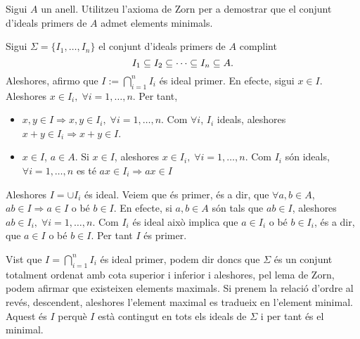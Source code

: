 \documentclass[../main.tex]{subfiles}
\begin{document}
\setcounter{exercici}{25}
\begin{exercici}
\label{esal26}
Sigui $A$ un anell. Utilitzeu l'axioma de Zorn per a demostrar que el conjunt d'ideals primers de $A$ admet elements minimals.
\end{exercici}
\begin{sol}
Sigui $\Sigma = \{I_1,\ldots,I_n\}$ el conjunt d'ideals primers de $A$ complint
\begin{equation}
    \notag
    I_1\subseteq I_2\subseteq \cdots \subseteq I_n\subseteq A.
\end{equation}
Aleshores, afirmo que $I:=\bigcap_{i=1}^n I_i$ és ideal primer. En efecte, sigui $x\in I$. Aleshores $x\in I_i,\;\forall i=1,\ldots,n$. Per tant,
\begin{itemize}
    \item $x,y\in I\Rightarrow x,y\in I_i,\;\forall i=1,\ldots,n$. Com $\forall i$, $I_i$ ideals, aleshores $x+y\in I_i\Rightarrow x+y\in I$.
    \item $x\in I$, $a\in A$. Si $x\in I$, aleshores $x\in I_i,\;\forall i=1,\ldots,n$. Com $I_i$ són ideals, $\forall i=1,\ldots,n$ es té $ax\in I_i\Rightarrow ax\in I$
\end{itemize}
Aleshores $I = \cup I_i$ és ideal. Veiem que és primer, és a dir, que $\forall a,b\in A$, $ab\in I\Rightarrow a\in I$ o bé $b\in I$. En efecte, si $a,b\in A$ són tals que $ab\in I$, aleshores $ab\in I_i,\;\forall i=1,\ldots,n$. Com $I_i$ és ideal això implica que $a\in I_i$ o bé $b\in I_i$, és a dir, que $a\in I$ o bé $b\in I$. Per tant $I$ és primer.

Vist que $I = \bigcap_{i=1}^n I_i$ és ideal primer, podem dir doncs que $\Sigma$ és un conjunt totalment ordenat amb cota superior i inferior i aleshores, pel lema de Zorn, podem afirmar que existeixen elements maximals. Si prenem la relació d'ordre al revés, descendent, aleshores l'element maximal es tradueix en l'element minimal. Aquest és $I$ perquè $I$ està contingut en tots els ideals de $\Sigma$ i per tant és el minimal.
\end{sol}
\end{document}
